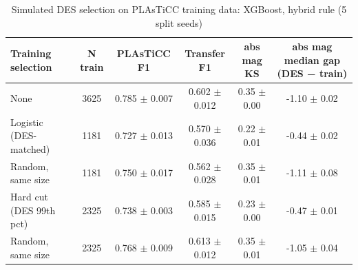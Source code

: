 \begin{table}
\centering
\caption{Simulated DES selection on PLAsTiCC training data: XGBoost, hybrid rule (5 split seeds)}
\begin{tabular}{lccccc}
\hline
Training selection & N train & PLAsTiCC F1 & Transfer F1 & abs mag KS & abs mag median gap (DES − train) \\
\hline
None & 3625 & 0.785 $\pm$ 0.007 & 0.602 $\pm$ 0.012 & 0.35 $\pm$ 0.00 & -1.10 $\pm$ 0.02 \\
Logistic (DES-matched) & 1181 & 0.727 $\pm$ 0.013 & 0.570 $\pm$ 0.036 & 0.22 $\pm$ 0.01 & -0.44 $\pm$ 0.02 \\
Random, same size & 1181 & 0.750 $\pm$ 0.017 & 0.562 $\pm$ 0.028 & 0.35 $\pm$ 0.01 & -1.11 $\pm$ 0.08 \\
Hard cut (DES 99th pct) & 2325 & 0.738 $\pm$ 0.003 & 0.585 $\pm$ 0.015 & 0.23 $\pm$ 0.00 & -0.47 $\pm$ 0.01 \\
Random, same size & 2325 & 0.768 $\pm$ 0.009 & 0.613 $\pm$ 0.012 & 0.35 $\pm$ 0.01 & -1.05 $\pm$ 0.04 \\
\hline
\end{tabular}
\end{table}
